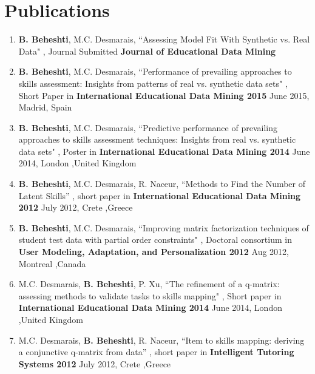 \section{Publications}
\begin{enumerate}

\item \textbf{B. Beheshti}, M.C. Desmarais, “Assessing Model Fit With Synthetic vs. Real Data" , Journal Submitted \DIFdelbegin {}\DIFdelend \DIFaddbegin {}\DIFaddend \textbf{Journal of Educational Data Mining}
\DIFdelbegin {}\DIFdelend 

\item \textbf{B. Beheshti}, M.C. Desmarais, “Performance of prevailing approaches to skills assessment: Insights from patterns of real vs. synthetic data sets" , Short Paper  in \textbf{International Educational Data Mining 2015} June 2015, Madrid, Spain
\DIFdelbegin {}%
\DIFdelend 

\item \textbf{B. Beheshti}, M.C. Desmarais, “Predictive performance of prevailing approaches to skills assessment techniques: Insights from real vs. synthetic data sets" , Poster in \textbf{International Educational Data Mining 2014} June 2014, London ,United Kingdom
\DIFdelbegin {}%
\DIFdelend 

\item \textbf{B. Beheshti}, M.C. Desmarais, R. Naceur, “Methods to Find the Number of Latent Skills” , short paper in \textbf{International Educational Data Mining 2012} July 2012, Crete ,Greece 
\DIFdelbegin {}\DIFdelend 

\item \textbf{B. Beheshti}, M.C. Desmarais, “Improving matrix factorization techniques of student test data with partial order constraints" , Doctoral consortium in \textbf{User Modeling, Adaptation, and Personalization 2012} Aug 2012, Montreal ,Canada 
\DIFdelbegin {}\DIFdelend 

\item M.C. Desmarais, \textbf{B. Beheshti}, P. Xu, “The refinement of a q-matrix: assessing methods to validate tasks to skills mapping" , Short paper in \textbf{International Educational Data Mining 2014} June 2014, London ,United Kingdom
\DIFdelbegin {}\DIFdelend 

\item M.C. Desmarais, \textbf{B. Beheshti}, R. Naceur, “Item to skills mapping: deriving a conjunctive q-matrix from data” , short paper in \textbf{Intelligent Tutoring Systems 2012} July 2012, Crete ,Greece 
\DIFdelbegin {}\DIFdelend 


\end{enumerate}
